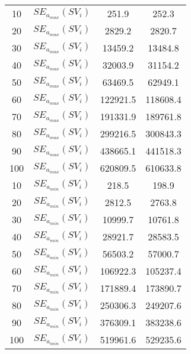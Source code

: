 \begin{table}[H]
\begin{tabular}{cc|cc}
	10                & $SE_{a_{max}}(SV_i)$              & 251.9                    & 252.3                            \\
	20                & $SE_{a_{max}}(SV_i)$              & 2829.2                   & 2820.7                           \\
	30                & $SE_{a_{max}}(SV_i)$              & 13459.2                  & 13484.8                          \\
	40                & $SE_{a_{max}}(SV_i)$              & 32003.9                  & 31154.2                          \\
	50                & $SE_{a_{max}}(SV_i)$              & 63469.5                  & 62949.1                          \\
	60                & $SE_{a_{max}}(SV_i)$              & 122921.5                 & 118608.4                         \\
	70                & $SE_{a_{max}}(SV_i)$              & 191331.9                 & 189761.8                         \\
	80                & $SE_{a_{max}}(SV_i)$              & 299216.5                 & 300843.3                         \\
	90                & $SE_{a_{max}}(SV_i)$              & 438665.1                 & 441518.3                         \\
	100               & $SE_{a_{max}}(SV_i)$              & 620809.5                 & 610633.8                         \\
	10                & $SE_{a_{min}}(SV_i)$            & 218.5                    & 198.9                            \\
	20                & $SE_{a_{min}}(SV_i)$            & 2812.5                   & 2763.8                           \\
	30                & $SE_{a_{min}}(SV_i)$            & 10999.7                  & 10761.8                          \\
	40                & $SE_{a_{min}}(SV_i)$            & 28921.7                  & 28583.5                          \\
	50                & $SE_{a_{min}}(SV_i)$            & 56503.2                  & 57000.7                          \\
	60                & $SE_{a_{min}}(SV_i)$            & 106922.3                 & 105237.4                         \\
	70                & $SE_{a_{min}}(SV_i)$            & 171889.4                 & 173890.7                         \\
	80                & $SE_{a_{min}}(SV_i)$            & 250306.3                 & 249207.6                         \\
	90                & $SE_{a_{min}}(SV_i)$            & 376309.1                 & 383238.6                         \\
	100               & $SE_{a_{min}}(SV_i)$            & 519961.6                 & 529235.6                        
\end{tabular}
\end{table}

